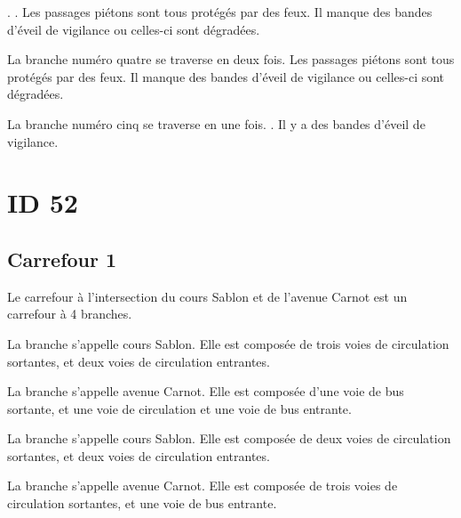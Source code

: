 \begin{appendix}
. . Les passages piétons sont tous protégés par des feux. Il manque des bandes d'éveil de vigilance ou celles-ci sont dégradées.

\newpar{}

La branche numéro quatre se traverse en deux fois. Les passages piétons sont tous protégés par des feux. Il manque des bandes d'éveil de vigilance ou celles-ci sont dégradées.

\newpar{}

La branche numéro cinq se traverse en une fois.  . Il y a des bandes d'éveil de vigilance.

\section*{ID 52}

\label{annexe:q_ID52}

\subsection*{Carrefour 1}

\label{annexe:q_ID52_carrefour1}

Le carrefour à l'intersection du cours Sablon et de l'avenue Carnot est un carrefour à 4 branches.


\newpar{}

La branche  s'appelle cours Sablon. Elle est composée de trois voies de circulation sortantes, et deux voies de circulation entrantes.

\newpar{}

La branche  s'appelle avenue Carnot. Elle est composée d'une voie de bus sortante, et une voie de circulation et une voie de bus entrante.

\newpar{}

La branche  s'appelle cours Sablon. Elle est composée de deux voies de circulation sortantes, et deux voies de circulation entrantes.

\newpar{}

La branche  s'appelle avenue Carnot. Elle est composée de trois voies de circulation sortantes, et une voie de bus entrante.


\end{appendix}
